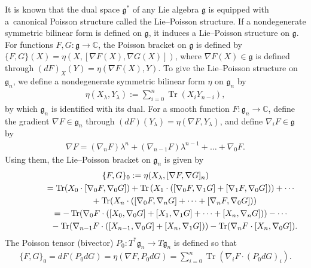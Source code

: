 \documentclass[pdftex]{sigma}
\numberwithin{equation}{section}
\begin{document}
It is known that the dual space $\mathfrak{g}^*$ of any Lie algebra $\mathfrak{g}$ is equipped with a~canonical Poisson structure called the Lie--Poisson structure. If a nondegenerate symmetric bilinear form  is def\/ined on $\mathfrak{g}$,
it induces a Lie--Poisson structure on $\mathfrak{g}$. For functions $F, G\colon \mathfrak{g} \to \mathbb{C}$, the Poisson bracket on $\mathfrak{g}$ is def\/ined by $\{ F, G\}(X) = \eta (X, [\nabla F(X), \nabla G(X)])$, where $\nabla F(X) \in \mathfrak{g}$ is def\/ined through $(dF)_X(Y) = \eta (\nabla F(X), Y)$.
To give the Lie--Poisson structure on $\mathfrak{g}_n$, we def\/ine a nondegenerate symmetric bilinear form $\eta$ on $\mathfrak{g}_n$ by
\begin{gather*}
\eta (X_\lambda , Y_\lambda ):= \sum^n_{i=0} \operatorname{Tr}(X_iY_{n-i}),
\end{gather*}
by which $\mathfrak{g}_n$ is identif\/ied with its dual. For a smooth function $F\colon \mathfrak{g}_n \to \mathbb{C}$, def\/ine the gradient $\nabla F \in \mathfrak{g}_n$ through $ (dF)(Y_\lambda ) = \eta (\nabla F, Y_\lambda )$, and def\/ine $\nabla _iF\in \mathfrak{g}$ by
\begin{gather*}
 \nabla F = (\nabla _n F) \lambda ^n + (\nabla _{n-1}F) \lambda ^{n-1} + \dots + \nabla _0 F.
\end{gather*}
Using them, the Lie--Poisson bracket on $\mathfrak{g}_n$ is given by
\begin{gather*}
\{ F, G\}_0 := \eta (X_\lambda , [\nabla F, \nabla G]_n) \\
\hphantom{\{ F, G\}_0}{} = \operatorname{Tr}(X_0 \cdot [\nabla _0F, \nabla _0G])
 + \operatorname{Tr}\left( X_1\cdot ( [\nabla _0F, \nabla _1G]+[\nabla _1F, \nabla _0G]) \right) +\cdots \\
\hphantom{\{ F, G\}_0=}{} + \operatorname{Tr} (X_n\cdot ( [\nabla _0F, \nabla _nG] + \dots + [\nabla _nF, \nabla _0G])) \\
\hphantom{\{ F, G\}_0}{}= -\operatorname{Tr} (\nabla _0F \cdot ([X_0, \nabla _0G]+[X_1, \nabla _1G]+ \dots + [X_n, \nabla _nG])) - \cdots \\
\hphantom{\{ F, G\}_0=}{} -\operatorname{Tr}(\nabla _{n-1}F \cdot ([X_{n-1}, \nabla _0G] + [X_n, \nabla _1G])) - \operatorname{Tr} (\nabla _nF \cdot [X_n, \nabla _0G]).
\end{gather*}
The Poisson tensor (bivector) $P_0 \colon T^*\mathfrak{g}_n \to T\mathfrak{g}_n$ is def\/ined so that
\begin{gather*}
\{ F, G\}_0 = dF (P_0dG) = \eta (\nabla F, P_0dG) = \sum^n_{i=0} \operatorname{Tr}(\nabla _iF \cdot (P_0dG)_i).
\end{gather*}
\end{document}
